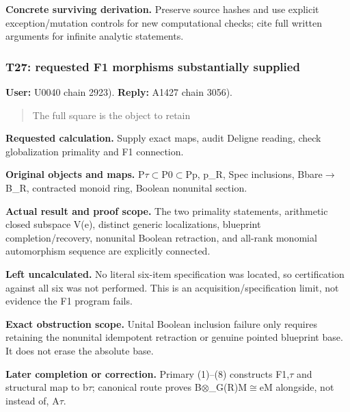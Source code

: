 \textbf{Concrete surviving derivation.} Preserve source hashes and use
explicit exception/mutation controls for new computational checks; cite
full written arguments for infinite analytic statements.

\subsubsection{T27: requested F1 morphisms substantially
supplied}\label{TranscriptLedgerStage:t27-requested-f1-morphisms-substantially-supplied}

\textbf{User:} U0040
\protect{} chain 2923).
\textbf{Reply:} A1427
\protect{} chain 3056).

\begin{quote}
The full square is the object to retain
\end{quote}

\textbf{Requested calculation.} Supply exact maps, audit Deligne
reading, check globalization primality and F1 connection.

\textbf{Original objects and maps.}
P\allowbreak{}\ensuremath{τ}\allowbreak{}\allowbreak{}\ensuremath{⊂}\allowbreak{}P0\allowbreak{}\ensuremath{⊂}\allowbreak{}Pp,
p\_R, Spec inclusions,
Bbare\allowbreak{}\ensuremath{→}\allowbreak{}B\_R, contracted monoid
ring, Boolean nonunital section.

\textbf{Actual result and proof scope.} The two primality statements,
arithmetic closed subspace V(e), distinct generic localizations,
blueprint completion/recovery, nonunital Boolean retraction, and
all-rank monomial automorphism sequence are explicitly connected.

\textbf{Left uncalculated.} No literal six-item specification was
located, so certification against all six was not performed. This is an
acquisition/specification limit, not evidence the F1 program fails.

\textbf{Exact obstruction scope.} Unital Boolean inclusion failure only
requires retaining the nonunital idempotent retraction or genuine
pointed blueprint base. It does not erase the absolute base.

\textbf{Later completion or correction.} Primary (1)--(8) constructs
F1,\allowbreak{}\ensuremath{τ}\allowbreak{} and structural map to
b\allowbreak{}\ensuremath{τ}\allowbreak{}; canonical route proves
B\allowbreak{}\ensuremath{⊗}\allowbreak{}\_G(R)M\allowbreak{}\ensuremath{≅}\allowbreak{}eM
alongside, not instead of, A\allowbreak{}\ensuremath{τ}\allowbreak{}.

